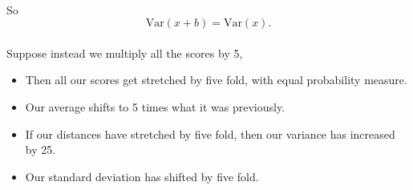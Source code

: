 \documentclass[letterpaper,12pt]{article}
\begin{document}
\paragraph{}So
\[
    \mathrm{Var}(x+b) = \mathrm{Var}(x)
.\]
\paragraph{}Suppose instead we multiply all the scores by 5, 
\begin{itemize}
   \item Then all our scores get stretched by five fold, with equal probability measure. 
   \item Our average shifts to 5 times what it was previously.
   \item If our distances have stretched by five fold, then our variance has increased by 25.
   \item Our standard deviation has shifted by five fold.
\end{itemize}
\end{document}
